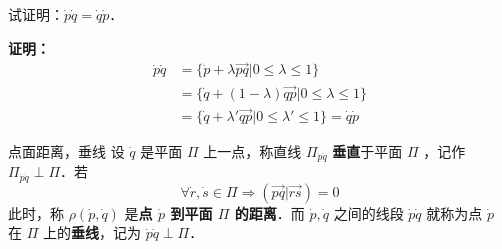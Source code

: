 \begin{example}{}
试证明：$\dot p\dot q=\dot q\dot p$．

\textbf{证明：}
\begin{equation}
\begin{aligned}
\dot p\dot q&=\{\dot p+\lambda\vec{pq}|0\leq\lambda\leq1\}\\
&=\{\dot q+(1-\lambda)\vec{qp}|0\leq\lambda\leq1\}\\
&=\{\dot q+\lambda'\vec{qp}|0\leq\lambda'\leq1\}=\dot q\dot p
\end{aligned}
\end{equation}
\end{example}
\begin{definition}{点面距离，垂线}
设 $\dot q$ 是平面 $\Pi$ 上一点，称直线 $\Pi_{\dot p\dot q}$ \textbf{垂直}于平面 $\Pi$ ，记作 $\Pi_{\dot p\dot q}\perp\Pi$．若
\begin{equation}
\forall \dot r,\dot s\in\Pi\Rightarrow (\vec{pq}|\vec{rs})=0
\end{equation}
此时，称 $\rho(\dot p,\dot q)$ 是\textbf{点 $\dot p$ 到平面 $\Pi$ 的距离}．而 $\dot p,\dot q$ 之间的线段 $\dot p\dot q$ 就称为点 $\dot p$ 在 $\Pi$ 上的\textbf{垂线}，记为 $\dot p\dot q\perp\Pi$．
\end{definition}